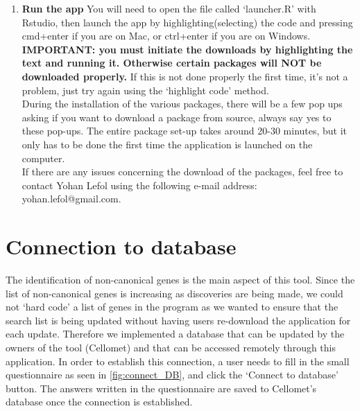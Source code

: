 \documentclass[11pt]{article}
\begin{document}
\begin{enumerate}
\item \textbf{Run the app}
You will need to open the file called `launcher.R' with Rstudio, then launch the app by highlighting(selecting) the code and pressing cmd+enter if you are on Mac, or ctrl+enter if you are on Windows.\\
\textbf{IMPORTANT: you must initiate the downloads by highlighting the text and running it. Otherwise certain packages will NOT be downloaded properly.} If this is not done properly the first time, it's not a problem, just try again using the `highlight code' method.\\
During the installation of the various packages, there will be a few pop ups asking if you want to download a package from source, always say yes to these pop-ups. The entire package set-up takes around 20-30 minutes, but it only has to be done the first time the application is launched on the computer.\\
If there are any issues concerning the download of the packages, feel free to contact Yohan Lefol using the following e-mail address: yohan.lefol@gmail.com.

\end{enumerate}


\section{Connection to database}
The identification of non-canonical genes is the main aspect of this tool. Since the list of non-canonical genes is increasing as discoveries are being made, we could not `hard code' a list of genes in the program as we wanted to ensure that the search list is being updated without having users re-download the application for each update. Therefore we implemented a database that can be updated by the owners of the tool (Cellomet) and that can be accessed remotely through this application.
In order to establish this connection, a user needs to fill in the small questionnaire as seen in \autoref{fig:connect_DB}, and click the `Connect to database' button. The answers written in the questionnaire are saved to Cellomet's database once the connection is established.
\end{document}
